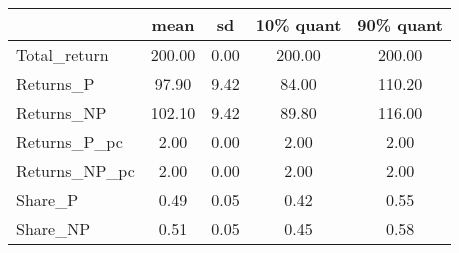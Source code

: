 \begin{tabular}{lcccc}
\toprule
{} &    mean &    sd &  10\% quant &  90\% quant \\
\midrule
Total\_return  &  200.00 &  0.00 &     200.00 &     200.00 \\
Returns\_P     &   97.90 &  9.42 &      84.00 &     110.20 \\
Returns\_NP    &  102.10 &  9.42 &      89.80 &     116.00 \\
Returns\_P\_pc  &    2.00 &  0.00 &       2.00 &       2.00 \\
Returns\_NP\_pc &    2.00 &  0.00 &       2.00 &       2.00 \\
Share\_P       &    0.49 &  0.05 &       0.42 &       0.55 \\
Share\_NP      &    0.51 &  0.05 &       0.45 &       0.58 \\
\bottomrule
\end{tabular}
